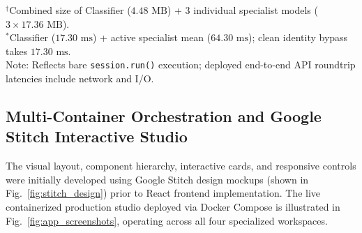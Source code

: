 \documentclass[conference]{IEEEtran}
\begin{document}
\begin{table}[!t]
\centering
\caption{Production Model Artifact Sizes and Raw Single-Image CPU Latency ($128\times 128$).}
\label{tab:deployment_benchmarks}
\vspace{1mm}
\parbox{\columnwidth}{\footnotesize
$^\dagger$Combined size of Classifier ($4.48\text{ MB}$) + 3 individual specialist models ($3\times 17.36\text{ MB}$).\\
$^*$Classifier ($17.30\text{ ms}$) + active specialist mean ($64.30\text{ ms}$); clean identity bypass takes $17.30\text{ ms}$.\\
Note: Reflects bare \texttt{session.run()} execution; deployed end-to-end API roundtrip latencies include network and I/O.}
\end{table}

\subsection{Multi-Container Orchestration and Google Stitch Interactive Studio}
The visual layout, component hierarchy, interactive cards, and responsive controls were initially developed using Google Stitch design mockups (shown in Fig.~\ref{fig:stitch_design}) prior to React frontend implementation. The live containerized production studio deployed via Docker Compose is illustrated in Fig.~\ref{fig:app_screenshots}, operating across all four specialized workspaces.
\end{document}
